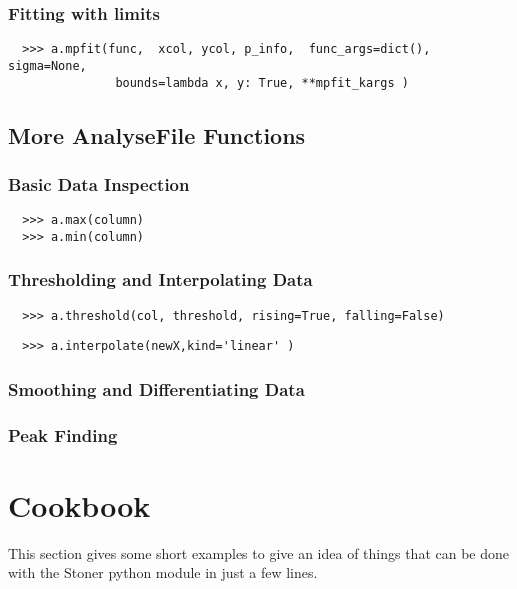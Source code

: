 \documentclass[a4paper,11pt]{scrartcl}
\begin{document}
\subsubsection{Fitting with limits}
\begin{verbatim}
  >>> a.mpfit(func,  xcol, ycol, p_info,  func_args=dict(), sigma=None,
               bounds=lambda x, y: True, **mpfit_kargs )
\end{verbatim}

\subsection{More AnalyseFile Functions}

\subsubsection{Basic Data Inspection}
\begin{verbatim}
  >>> a.max(column)
  >>> a.min(column)
\end{verbatim}

\subsubsection{Thresholding and Interpolating Data}
\begin{verbatim}
  >>> a.threshold(col, threshold, rising=True, falling=False)
\end{verbatim}

\begin{verbatim}
  >>> a.interpolate(newX,kind='linear' )
\end{verbatim}

\subsubsection{Smoothing and Differentiating Data}

\subsubsection{Peak Finding}

\section{Cookbook}

This section gives some short examples to give an idea of things that can be done with the Stoner python module in just a few lines.
\end{document}
